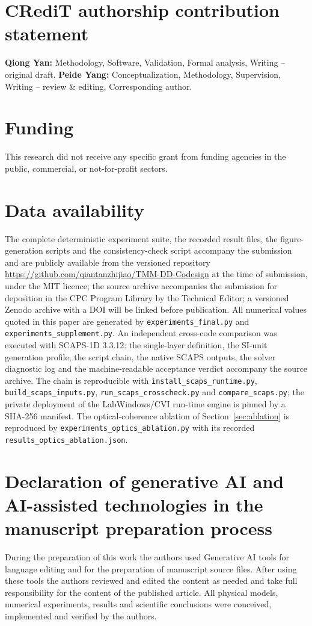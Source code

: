 \documentclass[preprint,12pt]{elsarticle}
\begin{document}
\section*{CRediT authorship contribution statement}
\textbf{Qiong Yan:} Methodology, Software, Validation, Formal analysis,
Writing -- original draft. \textbf{Peide Yang:} Conceptualization,
Methodology, Supervision, Writing -- review \& editing, Corresponding author.

\section*{Funding}
This research did not receive any specific grant from funding agencies in the
public, commercial, or not-for-profit sectors.

\section*{Data availability}
The complete deterministic experiment suite, the recorded result files, the
figure-generation scripts and the consistency-check script accompany the
submission and are publicly available from the versioned repository
\url{https://github.com/qiantanzhijiao/TMM-DD-Codesign} at the time of submission, under the MIT licence; the source archive accompanies the submission for deposition in the
CPC Program Library by the Technical Editor; a versioned Zenodo archive
with a DOI will be linked before publication. All numerical values quoted in this paper are generated by
\mbox{\texttt{experiments\_final.py}} and
\mbox{\texttt{experiments\_supplement.py}}. An independent
cross-code comparison was executed with SCAPS-1D 3.3.12: the
single-layer definition, the SI-unit generation profile, the script
chain, the native SCAPS outputs, the solver diagnostic log and the
machine-readable acceptance verdict accompany the source archive.
The chain is reproducible with \texttt{install\_scaps\_runtime.py},
\texttt{build\_scaps\_inputs.py},
\texttt{run\_scaps\_crosscheck.py} and
\texttt{compare\_scaps.py}; the private deployment of the
LabWindows/CVI run-time engine is pinned by a SHA-256 manifest. The optical-coherence ablation of Section~\ref{sec:ablation} is
reproduced by \texttt{experiments\_optics\_ablation.py} with its
recorded \texttt{results\_optics\_ablation.json}.

\section*{Declaration of generative AI and AI-assisted technologies in the
manuscript preparation process}
During the preparation of this work the authors used Generative AI tools
for language editing and for the preparation of manuscript source files.
After using these tools the authors reviewed and edited the content as
needed and take full responsibility for the content of the published
article. All physical models, numerical experiments, results and
scientific conclusions were conceived, implemented and verified by the
authors.
\end{document}
